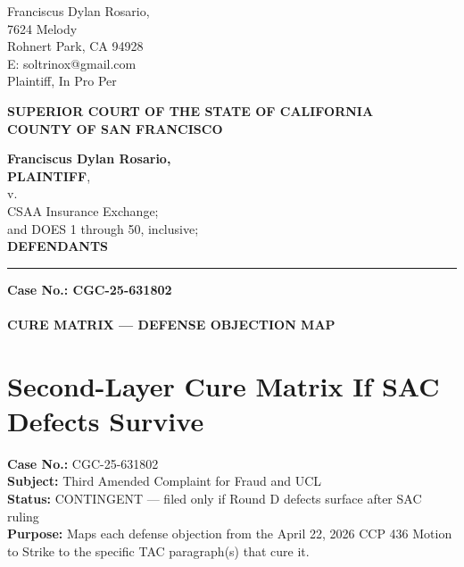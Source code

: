 

\nolinenumbers
\begin{singlespace}
Franciscus Dylan Rosario, \\
7624 Melody \\
Rohnert Park, CA 94928 \\
E: soltrinox@gmail.com \\
Plaintiff, In Pro Per \\
\end{singlespace}
\vspace*{9mm}
\begin{tightcenter}
\textbf{SUPERIOR COURT OF THE STATE OF CALIFORNIA} \\
\textbf{COUNTY OF SAN FRANCISCO}
\end{tightcenter}
\vspace*{2.25mm}
\nolinenumbers
\begin{minipage}[t]{3in}
    \raggedright
    \textbf{Franciscus Dylan Rosario,} \\ \textbf{PLAINTIFF}, \\
    \hspace{1cm} v. \\
    \small
    CSAA Insurance Exchange; \\
    and DOES 1 through 50, inclusive; \\
    \normalsize
    \textbf{DEFENDANTS}
    \makebox[3in]{\hrulefill}
\end{minipage}%
\hspace{3mm}
\begin{minipage}[t]{0.5pt}
    \vspace{0pt}
    \rule{0.5pt}{2.0in}
\end{minipage}
\hspace{3mm}
\begin{minipage}[t]{3in}
    \raggedright
    \noindent \textbf{Case No.: CGC-25-631802} \\
    ~\\
    \textbf{CURE MATRIX --- DEFENSE OBJECTION MAP}
\end{minipage}
\vspace*{6mm}
\linenumbers
\section{Second-Layer Cure Matrix If SAC Defects Survive}\label{second-layer-cure-matrix-if-sac-defects-survive}

\textbf{Case No.:} CGC-25-631802\\
\textbf{Subject:} Third Amended Complaint for Fraud and UCL\\
\textbf{Status:} CONTINGENT --- filed only if Round D defects surface after SAC ruling\\
\textbf{Purpose:} Maps each defense objection from the April 22, 2026 CCP \textsection{} 436 Motion to Strike to the specific TAC paragraph(s) that cure it.

